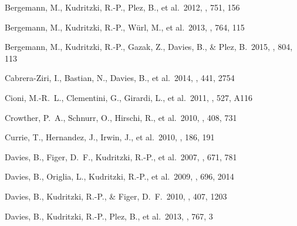 \documentclass[useAMS,usenatbib]{mn2e}
\begin{document}
\begin{thebibliography}{99}




 Bergemann, M.,
Kudritzki, R.-P., Plez, B., et al.\ 2012, \apj, 751, 156

 Bergemann, M.,
Kudritzki, R.-P., W{\"u}rl, M., et al.\ 2013, \apj, 764, 115

 Bergemann, M.,
Kudritzki, R.-P., Gazak, Z., Davies, B., \& Plez, B.\ 2015, \apj, 804, 113

 Cabrera-Ziri, I.,
Bastian, N., Davies, B., et al.\ 2014, \mnras, 441, 2754

 Cioni, M.-R.~L., Clementini, G., Girardi, L., et al.\ 2011, \aap, 527, A116


 Crowther, P.~A.,
Schnurr, O., Hirschi, R., et al.\ 2010, \mnras, 408, 731

 Currie, T., Hernandez,
J., Irwin, J., et al.\ 2010, \apjs, 186, 191

 Davies, B., Figer,
D.~F., Kudritzki, R.-P., et al.\ 2007, \apj, 671, 781

 Davies, B., Origlia, L.,
Kudritzki, R.-P., et al.\ 2009, \apj, 696, 2014

 Davies, B., Kudritzki,
R.-P., \& Figer, D.~F.\ 2010, \mnras, 407, 1203

 Davies, B., Kudritzki,
R.-P., Plez, B., et al.\ 2013, \apj, 767, 3


\end{thebibliography}
\end{document}
